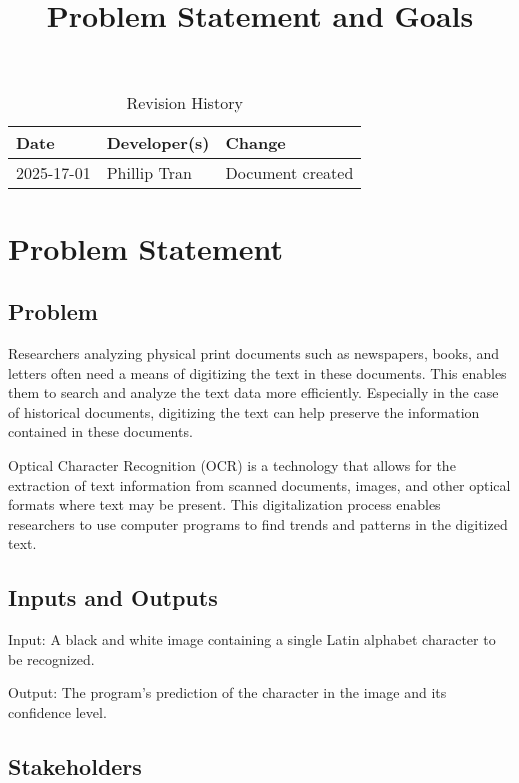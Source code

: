 \documentclass{article}
\title{Problem Statement and Goals\\\progname}
\author{\authname}
\date{}
\begin{document}
\maketitle

\begin{table}[hp]
\caption{Revision History} \label{TblRevisionHistory}
\begin{tabularx}{\textwidth}{llX}
\toprule
\textbf{Date} & \textbf{Developer(s)} & \textbf{Change}\\
\midrule
2025-17-01 & Phillip Tran & Document created \\
\bottomrule
\end{tabularx}
\end{table}

\section{Problem Statement}

\subsection{Problem}

Researchers analyzing physical print documents such as newspapers, books, and
letters often need a means of digitizing the text in these documents. This
enables them to search and analyze the text data more efficiently. Especially
in the case of historical documents, digitizing the text can help preserve the
information contained in these documents.

Optical Character Recognition (OCR) is a technology that allows for the
extraction of text information from scanned documents, images, and other optical
formats where text may be present. This digitalization process enables
researchers to use computer programs to find trends and patterns in the
digitized text.


\subsection{Inputs and Outputs}

Input: A black and white image containing a single Latin alphabet character to
be recognized.

Output: The program's prediction of the character in the image and its
confidence level.

\subsection{Stakeholders}
\end{document}
